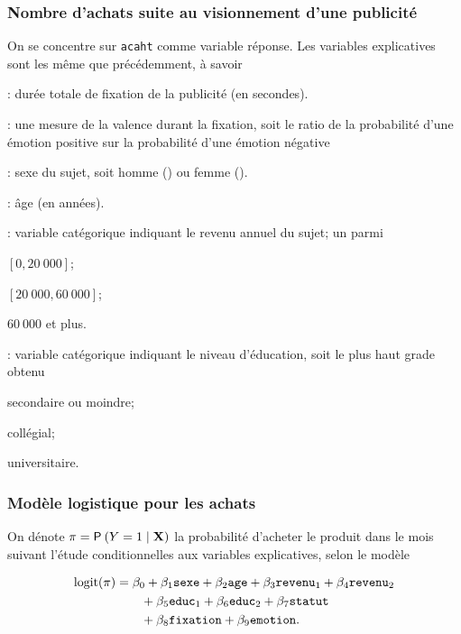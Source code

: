 \documentclass{beamer}
\begin{document}
\begin{frame}[fragile]
\frametitle{Nombre d'achats suite au visionnement d'une publicité}
On se concentre sur \texttt{acaht} comme variable réponse. Les variables explicatives sont les même que précédemment, à savoir
 {\small 
\bi
\item {}: durée totale de fixation de la publicité (en secondes).
\item {}: une mesure de la valence durant la fixation, soit le ratio
de la probabilité d’une émotion positive sur la probabilité d’une émotion négative
\item {}: sexe du sujet, soit homme () ou femme ().
\item {}: âge (en années).
\item {}: variable catégorique indiquant le revenu annuel du sujet; un parmi
{ \footnotesize
\be
\item $[0,  20\ 000]$;
\item $[20\ 000,  60\ 000]$;
\item $60\ 000$ et plus.
\ee
}
\item {}: variable catégorique indiquant le niveau d'éducation, soit le plus haut grade obtenu
{ \footnotesize \be
\item secondaire ou moindre;
\item collégial;
\item universitaire.
\ee}
\ei
}
\end{frame}
\begin{frame}[fragile]
\frametitle{Modèle logistique pour les achats}
On dénote $\pi=\P{Y=1\mid \mathbf{X}}$ la probabilité d'acheter le produit dans le mois suivant l'étude conditionnelles aux variables explicatives, selon le modèle

\begin{align*}
\logit(\pi)&=\beta_0 + \beta_1 \code{sexe} + \beta_2 \code{age} + \beta_3 \code{revenu}_1 + \beta_4 \code{revenu}_2 \\
&\qquad + \beta_5 \code{educ}_1 + \beta_6 \code{educ}_2 + \beta_7 \code{statut} \\
&\qquad + \beta_8 \code{fixation} + \beta_9 \code{emotion}.
\end{align*}



\end{frame}
\end{document}
